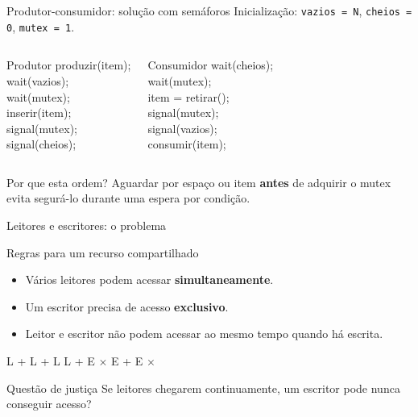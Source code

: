 \documentclass[aspectratio=169,11pt]{beamer}
\begin{document}
\begin{frame}[fragile]{Produtor-consumidor: solução com semáforos}
\small
Inicialização: \texttt{vazios = N}, \texttt{cheios = 0}, \texttt{mutex = 1}.
\vspace{0.15cm}
\begin{columns}[T,onlytextwidth]
\begin{block}{Produtor}
\ttfamily\scriptsize
produzir(item);\\
wait(vazios);\\
wait(mutex);\\
inserir(item);\\
signal(mutex);\\
signal(cheios);
\end{block}
\begin{block}{Consumidor}
\ttfamily\scriptsize
wait(cheios);\\
wait(mutex);\\
item = retirar();\\
signal(mutex);\\
signal(vazios);\\
consumir(item);
\end{block}
\end{columns}
\vspace{0.17cm}
\begin{alertblock}{Por que esta ordem?}
Aguardar por espaço ou item \textbf{antes} de adquirir o mutex evita segurá-lo durante uma espera por condição.
\end{alertblock}
\end{frame}



\begin{frame}{Leitores e escritores: o problema}
\begin{block}{Regras para um recurso compartilhado}
\begin{itemize}
\item Vários leitores podem acessar \textbf{simultaneamente}.
\item Um escritor precisa de acesso \textbf{exclusivo}.
\item Leitor e escritor não podem acessar ao mesmo tempo quando há escrita.
\end{itemize}
\end{block}
\vspace{0.3cm}
\begin{center}
\Large
\textcolor{verdeprod}{L + L + L \;\checkmark}\qquad
\textcolor{vermelhoerro}{L + E \;\(\times\)}\qquad
\textcolor{vermelhoerro}{E + E \;\(\times\)}
\end{center}
\vspace{0.2cm}
\begin{alertblock}{Questão de justiça}
Se leitores chegarem continuamente, um escritor pode nunca conseguir acesso?
\end{alertblock}
\end{frame}
\end{document}
